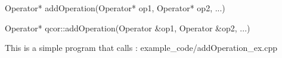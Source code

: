 
\begin{apidefinition}

\begin{Csynopsis}
    Operator* addOperation(Operator* op1, Operator* op2, ...)
\end{Csynopsis}

\begin{Cppsynopsis}
    Operator* qcor::addOperation(Operator &op1, Operator &op2, ...)
\end{Cppsynopsis}


\begin{apiarguments}
\end{apiarguments}



\apinotes{
    
}

\begin{apiexamples}

\apicppexample
    { This is a simple program that calls : } 
    { example_code/addOperation_ex.cpp} 
    {}

\end{apiexamples}

\end{apidefinition}

